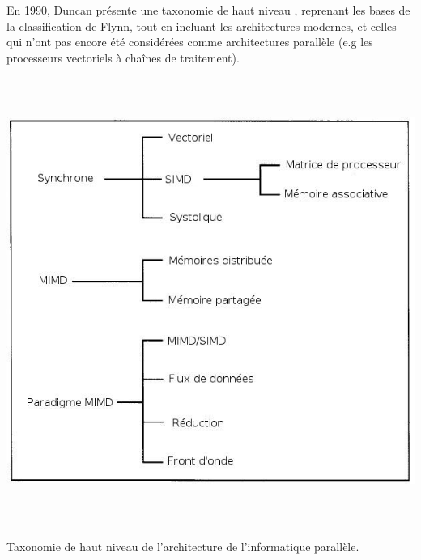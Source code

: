 \documentclass[a4paper,12pt]{report}
\theoremstyle{plain}				%
\theoremstyle{definition}				%
\begin{document}
En 1990, Duncan présente une taxonomie de haut niveau \cite{44900},
reprenant les bases de la classification de Flynn, tout en incluant
les architectures modernes, et celles qui n'ont pas encore été
considérées comme architectures parallèle (e.g les processeurs
vectoriels à chaînes de traitement).

{\centering
\includegraphics[width=16.272cm,height=14.605cm]{Biblio_PCmax_Rendu_Taxonomie_Duncan.jpg}
\par}
{\centering
Taxonomie de haut niveau de l'architecture de l'informatique parallèle.
\par}

\bigskip
\end{document}
